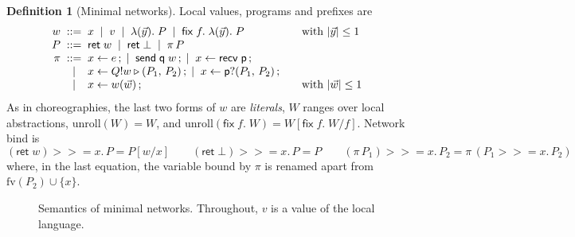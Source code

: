 \documentclass[11pt]{report}
\makeatletter
\theoremstyle{plain}
\theoremstyle{definition}
\newtheorem{definition}[theorem]{Definition}
\theoremstyle{remark}
\newcommand{\kw}[1]{\mathsf{#1}}
\newcommand{\pp}{\mathsf{p}}
\newcommand{\qq}{\mathsf{q}}
\newcommand{\rr}{\mathsf{r}}
\newcommand{\ttrue}{\kw{tt}}
\newcommand{\ffalse}{\kw{ff}}
\newcommand{\fv}{\mathrm{fv}}
\newcommand{\com}[3]{#1.#2 \to #3}
\newcommand{\mbind}[3]{#1 \mathbin{>\!\!>\!\!=} #2.\,#3}
\newcommand{\tauat}[1]{\tau\mathord{@}#1}
\newcommand{\castlbl}[3]{#1.#2 \rightsquigarrow #3}
\newcommand{\lto}[1]{\xrightarrow{\;#1\;}}
\newcommand{\nsend}[2]{\kw{send}\;#1\;#2}
\newcommand{\nrecv}[1]{\kw{recv}\;#1}
\newcommand{\sendbr}[4]{#1!#2 \mathbin{\triangleright} (#3,\,#4)}
\newcommand{\recvbr}[3]{#1?(#2,\,#3)}
\newcommand{\upd}[3]{#1[#2 \mapsto #3]}
\newcommand{\nlam}[2]{\lambda(#1).\;#2}
\newcommand{\nfix}[2]{\kw{fix}\;#1.\;#2}
\newcommand{\unroll}[1]{\mathrm{unroll}(#1)}
\newcommand{\rn}[1]{{\normalfont\scshape #1}}
\makeatother
\begin{document}
\begin{definition}[Minimal networks]\label{def:c5-net}
  Local values, programs and prefixes are
  \[
  \begin{array}{r@{\;\;}c@{\;\;}l@{\qquad}l}
    w & ::= & x \;\mid\; v \;\mid\; \nlam{\vec y}{P} \;\mid\; \nfix{f}{\nlam{\vec y}{P}} & \text{with } |\vec y|\le 1\\
    P & ::= & \kw{ret}\;w \;\mid\; \kw{ret}\;\bot \;\mid\; \pi\,P\\
    \pi & ::= & x\leftarrow e\,; \;\mid\; \nsend{\qq}{w}\,; \;\mid\; x\leftarrow\nrecv{\pp}\,;\\
        & \mid & x\leftarrow\sendbr{Q}{w}{P_1}{P_2}\,; \;\mid\; x\leftarrow\recvbr{\pp}{P_1}{P_2}\,;\\
        & \mid & x\leftarrow w(\vec w)\,; & \text{with } |\vec w|\le 1
  \end{array}
  \]
  As in choreographies, the last two forms of $w$ are \emph{literals}, $W$
  ranges over local abstractions, $\unroll{W}=W$, and
  $\unroll{\nfix{f}{W}}=W[\nfix{f}{W}/f]$.  Network bind is
  \[
  \mbind{(\kw{ret}\;w)}{x}{P} = P[w/x]
  \qquad
  \mbind{(\kw{ret}\;\bot)}{x}{P} = P
  \qquad
  \mbind{(\pi\,P_1)}{x}{P_2} = \pi\,(\mbind{P_1}{x}{P_2})
  \]
  where, in the last equation, the variable bound by $\pi$ is renamed apart
  from $\fv(P_2)\cup\{x\}$.
\end{definition}

\begin{figure}[t]
\caption{Semantics of minimal networks.  Throughout, $v$ is a value of the
  local language.}
\label{fig:c5-net}
\end{figure}
\end{document}
